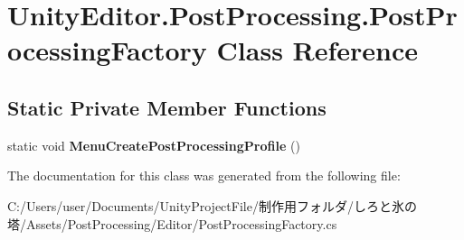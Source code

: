 \hypertarget{class_unity_editor_1_1_post_processing_1_1_post_processing_factory}{}\section{Unity\+Editor.\+Post\+Processing.\+Post\+Processing\+Factory Class Reference}
\label{class_unity_editor_1_1_post_processing_1_1_post_processing_factory}
\subsection*{Static Private Member Functions}
\begin{DoxyCompactItemize}
\item 
\mbox{\label{class_unity_editor_1_1_post_processing_1_1_post_processing_factory_a1db4ef615f0aec5b15f59ed9f5ba3354}} 
static void {\bfseries Menu\+Create\+Post\+Processing\+Profile} ()
\end{DoxyCompactItemize}


The documentation for this class was generated from the following file\+:\begin{DoxyCompactItemize}
\item 
C\+:/\+Users/user/\+Documents/\+Unity\+Project\+File/制作用フォルダ/しろと氷の塔/\+Assets/\+Post\+Processing/\+Editor/Post\+Processing\+Factory.\+cs\end{DoxyCompactItemize}
